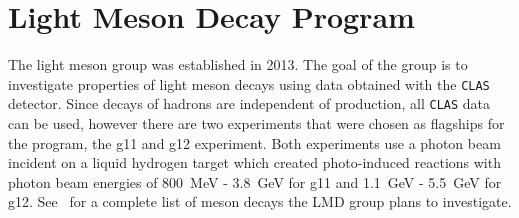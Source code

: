 \documentclass[epj]{webofc}
\begin{document}
\section{Light Meson Decay Program}
The light meson group was established in 2013. The goal of the group is to investigate properties of light meson decays using data obtained with the \textsc{\texttt{CLAS}} detector.
Since decays of hadrons are independent of production, all \textsc{\texttt{CLAS}} data can be used, however there are two experiments that were chosen as flagships for the program, the g11 and g12 experiment. Both experiments use a photon beam incident on a liquid hydrogen target which created photo-induced reactions with photon beam energies of 800~MeV - 3.8~GeV for g11 and 1.1~GeV - 5.5~GeV for g12.  See~\cite{lmdCAA} for a complete list of meson decays the LMD group plans to investigate. 
%
\end{document}
